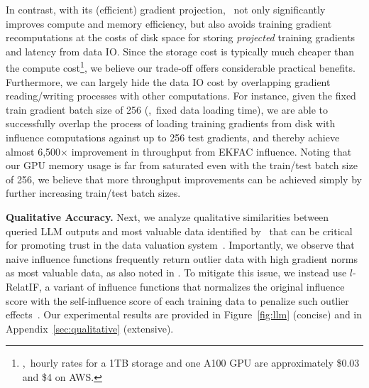 In contrast, with its (efficient) gradient projection, \method\ not only significantly improves compute and memory efficiency, but also avoids training gradient recomputations at the costs of disk space for storing \textit{projected} training gradients and latency from data IO. Since the storage cost is typically much cheaper than the compute cost\footnote{\eg,\ hourly rates for a 1TB storage and one A100 GPU are approximately \$0.03 and \$4 on AWS.}, we believe our trade-off offers considerable practical benefits. Furthermore, we can largely hide the data IO cost by overlapping gradient reading/writing processes with other computations. For instance, given the fixed train gradient batch size of 256 (\ie,\ fixed data loading time), we are able to successfully overlap the process of loading training gradients from disk with influence computations against up to 256 test gradients, and thereby achieve almost 6,500$\times$ improvement in throughput from EKFAC influence. Noting that our GPU memory usage is far from saturated even with the train/test batch size of 256, we believe that more throughput improvements can be achieved simply by further increasing train/test batch sizes.


\textbf{Qualitative Accuracy.\hspace{2.5mm}} Next, we analyze qualitative similarities between queried LLM outputs and most valuable data identified by \method\ that can be critical for promoting trust in the data valuation system~\cite{worledge2023unifying}. Importantly, we observe that naive influence functions frequently return outlier data with high gradient norms as most valuable data, as also noted in \cite{barshan2020relatif,grosse2023studying}. To mitigate this issue, we instead use $l$-RelatIF, a variant of influence functions that normalizes the original influence score with the self-influence score of each training data to penalize such outlier effects~\cite{barshan2020relatif}. Our experimental results are provided in Figure~\ref{fig:llm} (concise) and in Appendix~\ref{sec:qualitative} (extensive).

